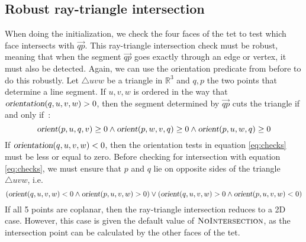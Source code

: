 \documentclass[../thesis.tex]{subfiles}
\begin{document}
\subsection{Robust ray-triangle intersection}
When doing the initialization, we check the four faces of the tet to test which face
intersects with $\Vec{qp}$. This ray-triangle intersection check must be robust, 
meaning that when the segment $\Vec{qp}$ goes exactly through an edge or vertex, it must also be detected.
Again, we can use the orientation predicate from before to do this robustly.
Let $\triangle uvw$ be a triangle in $\mathbb{R}^3$ and $q,p$ the two points
that determine a line segment. If $u,v,w$ is ordered in the way
that $\textsl{orientation}(q,u,v,w) > 0$, then the segment determined by $\Vec{qp}$
cuts the triangle if and only if~\cite{segura}:
\begin{equation}\label{eq:checks}
  \op{orient}(p,u,q,v) \ge 0 \land \op{orient}(p,w,v,q) \ge 0 \land \op{orient}(p,u,w,q) \ge 0 
\end{equation}
If $\textsl{orientation}(q,u,v,w) < 0$, then the orientation tests in equation \ref{eq:checks}
must be less or equal to zero.
Before checking for intersection with equation \ref{eq:checks}, we must ensure that 
$p$ and $q$ lie on opposite sides of the triangle $\triangle uvw$, i.e.
\begin{equation}\label{eq:sides}
  (\op{orient}(q,u,v,w) < 0 \land \op{orient}(p,u,v,w) > 0)  \lor (\op{orient}(q,u,v,w) > 0 \land \op{orient}(p,u,v,w) < 0)  
\end{equation}
If all 5 points are coplanar, then the ray-triangle intersection reduces to a 2D case.
However, this case is given the default value of $\textsc{NoIntersection}$, as the
intersection point can be calculated by the other faces of the tet. 
\end{document}

